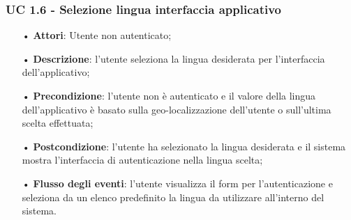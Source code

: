 
\subsubsection{UC 1.6 - Selezione lingua interfaccia applicativo}
\begin{itemize}
\item[•]\textbf{Attori}: Utente non autenticato;
\item[•]\textbf{Descrizione}: l’utente seleziona la lingua desiderata per l'interfaccia dell'applicativo;
\item[•]\textbf{Precondizione}: l’utente non è autenticato e il valore della lingua dell'applicativo è basato sulla geo-localizzazione dell'utente o sull'ultima scelta effettuata;
\item[•]\textbf{Postcondizione}: l’utente ha selezionato la lingua desiderata e il sistema mostra l'interfaccia di autenticazione nella lingua scelta;
\item[•]\textbf{Flusso degli eventi}: l'utente visualizza il form per l'autenticazione e seleziona da un elenco predefinito la lingua da utilizzare all'interno del sistema.
\end{itemize}
